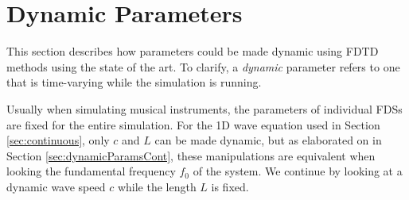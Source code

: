 \section{Dynamic Parameters}\label{sec:dynamicParams}
This section describes how parameters could be made dynamic using FDTD methods using the state of the art. %
To clarify, a \textit{dynamic} parameter refers to one that is time-varying while the simulation is running. 


Usually when simulating musical instruments, the parameters of individual FDSs are fixed for the entire simulation. For the 1D wave equation used in Section \ref{sec:continuous}, only $c$ and $L$ can be made dynamic, but as elaborated on in Section \ref{sec:dynamicParamsCont}, these manipulations are equivalent when looking the fundamental frequency $f_0$ of the system. We continue by looking at a dynamic wave speed $c$ while the length $L$ is fixed. %


